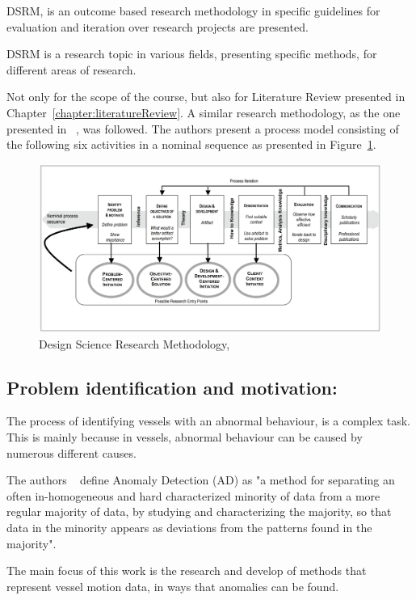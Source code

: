 DSRM, is an outcome based research methodology in specific guidelines for evaluation and iteration over research projects are presented.

DSRM is a research topic in various fields, presenting specific methods, for different areas of research. 

Not only for the scope of the course, but also for Literature Review presented in Chapter~\ref{chapter:literatureReview}. A similar research methodology, as the one presented in ~\cite{Peffers2007}, was followed.
The authors present a process model consisting of the following six activities in a nominal sequence as presented in Figure~\ref{fig:DSRMPeffers}.

\begin{figure}[H]
	\includegraphics[width=\linewidth]{figures/DSRMPeffers.PNG}
    \caption{Design Science Research Methodology, ~\cite{Peffers2007}}
    \label{fig:DSRMPeffers}
\end{figure}

\subsection{Problem identification and motivation:} 
The process of identifying vessels with an abnormal behaviour, is a complex task. This is mainly because in vessels, abnormal behaviour can be caused by numerous different causes.
  
The authors ~\cite{Laxhammar2008} define Anomaly Detection (AD) as "a method for separating an often in-homogeneous and hard characterized minority of data from a more regular majority of data, by studying and characterizing the majority, so that data in the minority appears as deviations from the patterns found in the majority". 

The main focus of this work is the research and develop of methods that represent vessel motion data, in ways that anomalies can be found.

